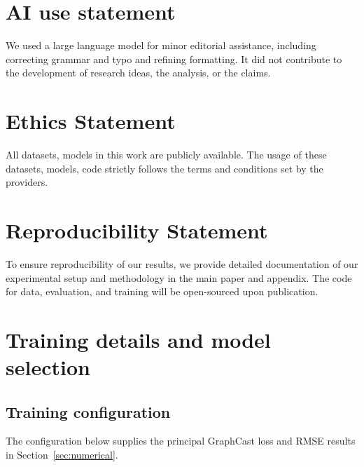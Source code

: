 \documentclass{article}
\newcommand{\suozhi}[1]{}
\renewcommand{\suozhi}[1]{}
\begin{document}
\clearpage
\section*{AI use statement}

We used a large language model for minor editorial assistance, including correcting grammar and
typo and refining formatting. It did not contribute to the development of research ideas, the analysis,
or the claims.

\section*{Ethics Statement}
All datasets, models in this work are publicly available. The usage of these datasets, models, code strictly follows the terms and conditions set by the providers. 

\section*{Reproducibility Statement}
To ensure reproducibility of our results, we provide detailed documentation of our experimental setup and methodology in the main paper and appendix. The code for data, evaluation,
and training will be open-sourced upon publication.






\clearpage
\appendix

\section{\texorpdfstring{{Training details and model selection}}{Training details and model selection}}
\label{app:training}

\subsection{Training configuration}
\label{app:training_configuration}
The configuration below supplies the principal {GraphCast loss} and RMSE results in Section~\ref{sec:numerical}.
\end{document}
